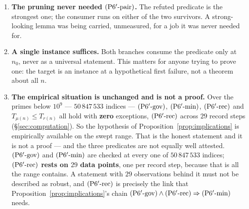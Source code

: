 \documentclass[11pt,a4paper]{article}
\theoremstyle{plain}
\theoremstyle{definition}
\theoremstyle{remark}
\newcommand{\Ppair}{\textup{(P6$'$-pair)}}
\newcommand{\Pgov}{\textup{(P6$'$-gov)}}
\newcommand{\Pmin}{\textup{(P6$'$-min)}}
\newcommand{\Prec}{\textup{(P6$'$-rec)}}
\begin{document}
\begin{enumerate}
\item \textbf{The pruning never needed $\Ppair$.} The refuted predicate is the strongest one;
  the consumer runs on either of the two survivors. A strong-looking lemma was being carried,
  unmeasured, for a job it was never needed for.
\item \textbf{A single instance suffices.} Both branches consume the predicate only at $n_0$,
  never as a universal statement. This matters for anyone trying to prove one: the target is
  an instance at a hypothetical first failure, not a theorem about all $n$.
\item \textbf{The empirical situation is unchanged and is not a proof.} Over the primes below
  $10^9$ --- $50\,847\,533$ indices --- $\Pgov$, $\Pmin$, $\Prec$ and $T_{\mu(n)} \le T_{r(n)}$
  all hold with \textbf{zero} exceptions, $\Prec$ across $29$ record steps
  (\S\ref{sec:computation}). So the hypothesis of
  Proposition~\ref{prop:implications} is empirically available on the swept range. That is the
  honest statement and it is not a proof --- and the three predicates are not equally well
  attested. $\Pgov$ and $\Pmin$ are checked at every one of $50\,847\,533$ indices;
  \textbf{$\Prec$ rests on $29$ data points}, one per record step, because that is all the
  range contains. A statement with $29$ observations behind it must not be described as
  robust, and $\Prec$ is precisely the link that
  Proposition~\ref{prop:implications}'s chain $\Pgov \wedge \Prec \Rightarrow \Pmin$ needs.
\end{enumerate}
\end{document}

